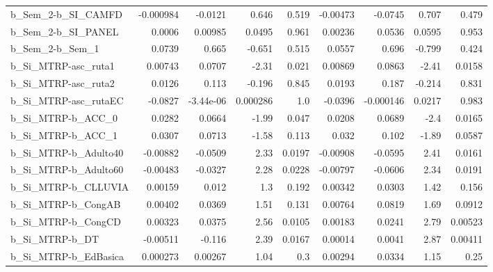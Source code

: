 \begin{tabular}{lrrrrrrrr}
b\_Sem\_2-b\_SI\_CAMFD         &   -0.000984 &      -0.0121 &     0.646 &    0.519 &   -0.00473 &     -0.0745 &        0.707 &         0.479 \\
b\_Sem\_2-b\_SI\_PANEL         &      0.0006 &      0.00985 &    0.0495 &    0.961 &    0.00236 &      0.0536 &       0.0595 &         0.953 \\
b\_Sem\_2-b\_Sem\_1            &      0.0739 &        0.665 &    -0.651 &    0.515 &     0.0557 &       0.696 &       -0.799 &         0.424 \\
b\_Si\_MTRP-asc\_ruta1        &     0.00743 &       0.0707 &     -2.31 &    0.021 &    0.00869 &      0.0863 &        -2.41 &        0.0158 \\
b\_Si\_MTRP-asc\_ruta2        &      0.0126 &        0.113 &    -0.196 &    0.845 &     0.0193 &       0.187 &       -0.214 &         0.831 \\
b\_Si\_MTRP-asc\_rutaEC       &     -0.0827 &    -3.44e-06 &  0.000286 &      1.0 &    -0.0396 &   -0.000146 &       0.0217 &         0.983 \\
b\_Si\_MTRP-b\_ACC\_0          &      0.0282 &       0.0664 &     -1.99 &    0.047 &     0.0208 &      0.0689 &         -2.4 &        0.0165 \\
b\_Si\_MTRP-b\_ACC\_1          &      0.0307 &       0.0713 &     -1.58 &    0.113 &      0.032 &       0.102 &        -1.89 &        0.0587 \\
b\_Si\_MTRP-b\_Adulto40       &    -0.00882 &      -0.0509 &      2.33 &   0.0197 &   -0.00908 &     -0.0595 &         2.41 &        0.0161 \\
b\_Si\_MTRP-b\_Adulto60       &    -0.00483 &      -0.0327 &      2.28 &   0.0228 &   -0.00797 &     -0.0606 &         2.34 &        0.0191 \\
b\_Si\_MTRP-b\_CLLUVIA        &     0.00159 &        0.012 &       1.3 &    0.192 &    0.00342 &      0.0303 &         1.42 &         0.156 \\
b\_Si\_MTRP-b\_CongAB         &     0.00402 &       0.0369 &      1.51 &    0.131 &    0.00764 &      0.0819 &         1.69 &        0.0912 \\
b\_Si\_MTRP-b\_CongCD         &     0.00323 &       0.0375 &      2.56 &   0.0105 &    0.00183 &      0.0241 &         2.79 &       0.00523 \\
b\_Si\_MTRP-b\_DT             &    -0.00511 &       -0.116 &      2.39 &   0.0167 &    0.00014 &      0.0041 &         2.87 &       0.00411 \\
b\_Si\_MTRP-b\_EdBasica       &    0.000273 &      0.00267 &      1.04 &      0.3 &    0.00294 &      0.0334 &         1.15 &          0.25 \\

\end{tabular}
